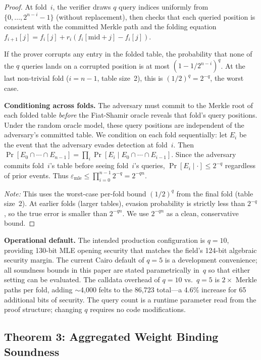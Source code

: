 \documentclass[10pt,twocolumn]{article}
\theoremstyle{definition}
\theoremstyle{remark}
\begin{document}
\begin{proof}
  At fold~$i$, the verifier draws $q$ query indices uniformly from
  $\{0,\ldots,2^{n-i}-1\}$ (without replacement), then checks that
  each queried position is consistent with the committed Merkle path
  and the folding equation $f_{i+1}[j] = f_i[j] + r_i(f_i[\text{mid}+j]-f_i[j])$.

  If the prover corrupts any entry in the folded table, the
  probability that none of the $q$ queries lands on a corrupted
  position is at most $(1-1/2^{n-i})^q$.
  At the last non-trivial fold ($i=n-1$, table size~2), this is
  $(1/2)^q = 2^{-q}$, the worst case.

  \textbf{Conditioning across folds.}
  The adversary must commit to the Merkle root of each folded
  table \emph{before} the Fiat-Shamir oracle reveals that fold's
  query positions.
  Under the random oracle model, these query positions are
  independent of the adversary's committed table.
  We condition on each fold sequentially:
  let $E_i$ be the event that the adversary evades detection at
  fold~$i$.
  Then $\Pr[E_0 \cap \cdots \cap E_{n-1}] =
  \prod_i \Pr[E_i \mid E_0 \cap \cdots \cap E_{i-1}]$.
  Since the adversary commits fold~$i$'s table before seeing
  fold~$i$'s queries, $\Pr[E_i \mid \cdot] \le 2^{-q}$
  regardless of prior events.
  Thus $\varepsilon_{\text{mle}} \le \prod_{i=0}^{n-1} 2^{-q} = 2^{-qn}$.

  \emph{Note:} This uses the worst-case per-fold bound
  $(1/2)^q$ from the final fold (table size~2).
  At earlier folds (larger tables), evasion probability is
  strictly less than $2^{-q}$, so the true error is smaller
  than $2^{-qn}$.
  We use $2^{-qn}$ as a clean, conservative bound.
\end{proof}

\textbf{Operational default.}
The intended production configuration is $q=10$, providing
130-bit MLE opening security that matches the field's 124-bit
algebraic security margin.
The current Cairo default of $q=5$ is a development
convenience; all soundness bounds in this paper are stated
parametrically in~$q$ so that either setting can be evaluated.
The calldata overhead of $q=10$ vs.\ $q=5$ is $2\times$ Merkle
paths per fold, adding $\sim$4{,}000 felts to the 86{,}723
total---a 4.6\% increase for 65 additional bits of security.
The query count is a runtime parameter read from the proof
structure; changing $q$ requires no code modifications.

\subsection{Theorem 3: Aggregated Weight Binding Soundness}
\end{document}
